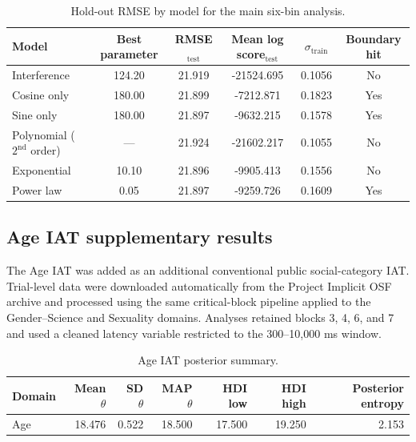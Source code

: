 \documentclass[12pt]{article}
\begin{document}
\begin{table}[htbp]
\centering
\caption{Hold-out RMSE by model for the main six-bin analysis.}
\label{tab:supp-model-comparison}
\small
\begin{tabular}{@{}lccccc@{}}
\toprule
Model & Best parameter & RMSE$_{\mathrm{test}}$ & Mean log score$_{\mathrm{test}}$ & $\sigma_{\mathrm{train}}$ & Boundary hit \\
\midrule
Interference & 124.20 & 21.919 & -21524.695 & 0.1056 & No \\
Cosine only & 180.00 & 21.899 & -7212.871 & 0.1823 & Yes \\
Sine only & 180.00 & 21.897 & -9632.215 & 0.1578 & Yes \\
Polynomial (\(2^{\mathrm{nd}}\) order) & --- & 21.924 & -21602.217 & 0.1055 & No \\
Exponential & 10.10 & 21.896 & -9905.413 & 0.1556 & No \\
Power law & 0.05 & 21.897 & -9259.726 & 0.1609 & Yes \\
\bottomrule
\end{tabular}
\end{table}

\subsection*{Age IAT supplementary results}

The Age IAT was added as an additional conventional public social-category IAT. Trial-level data were downloaded automatically from the Project Implicit OSF archive and processed using the same critical-block pipeline applied to the Gender--Science and Sexuality domains. Analyses retained blocks 3, 4, 6, and 7 and used a cleaned latency variable restricted to the 300--10{,}000 ms window.

\begin{table}[htbp]
\centering
\caption{Age IAT posterior summary.}
\label{tab:supp-age-posterior}
\small
\begin{tabular}{@{}lrrrrrr@{}}
\toprule
Domain & Mean $\theta$ & SD $\theta$ & MAP $\theta$ & HDI low & HDI high & Posterior entropy \\
\midrule
Age & 18.476 & 0.522 & 18.500 & 17.500 & 19.250 & 2.153 \\
\bottomrule
\end{tabular}
\end{table}
\end{document}
